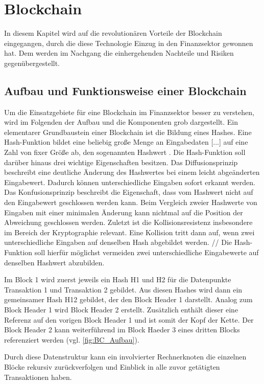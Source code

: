\section{Blockchain}
In diesem Kapitel wird auf die revolutionären Vorteile der Blockchain 
eingegangen, durch die diese Technologie Einzug in den Finanzsektor gewonnen 
hat. Dem werden im Nachgang die einhergehenden Nachteile und Risiken gegenübergestellt. 

\subsection{Aufbau und Funktionsweise einer Blockchain}
Um die Einsatzgebiete für eine Blockchain im Finanzsektor besser zu verstehen,
wird im Folgenden der Aufbau und die Komponenten grob dargestellt.
Ein elementarer Grundbaustein einer Blockchain ist die Bildung eines Hashes.
\glqq Eine Hash-Funktion bildet eine beliebig große Menge an Eingabedaten [...] auf eine Zahl von 
fixer Größe ab, den sogenannten Hashwert\grqq{} \cite[p.~6]{fill2020blockchain}.
Die Hash-Funktion soll darüber hinaus drei wichtige Eigenschaften besitzen.
Das Diffusionsprinzip beschreibt eine deutliche Änderung des Hashwertes bei einem leicht
abgeänderten Eingabewert. Dadurch können unterschiedliche Eingaben sofort erkannt werden.
Das Konfusionsprinzip beschreibt die Eigenschaft, dass vom Hashwert nicht auf den Eingabewert
geschlossen werden kann. Beim Vergleich zweier Hashwerte von Eingaben mit einer minimalen
Änderung kann nichtmal auf die Position der Abweichung geschlossen werden.
Zuletzt ist die Kollisionsresistenz insbesondere im Bereich der Kryptographie relevant.
Eine Kollision tritt dann auf, wenn zwei unterschiedliche Eingaben auf denselben Hash abgebildet
werden. // Die Hash-Funktion soll hierfür möglichst vermeiden zwei unterschiedliche Eingabewerte
auf denselben Hashwert abzubilden.
\cite[p.~6ff]{fill2020blockchain} 

Im Block 1 wird zuerst jeweils ein Hash H1 und H2 für die Datenpunkte Transaktion 1 
und Transaktion 2 gebildet. Aus diesen Hashes wird dann ein gemeinsamer Hash H12 gebildet, 
der den Block Header 1 darstellt.
Analog zum Block Header 1 wird Block Header 2 erstellt. Zusätzlich enthält dieser eine
Referenz auf den vorigen Block Header 1 und ist somit der Kopf der Kette. Der Block Header 2
kann weiterführend im Block Haeder 3 eines dritten Blocks referenziert werden 
(vgl. \autoref{fig:BC_Aufbau}). 

Durch diese Datenstruktur kann ein involvierter Rechnerknoten die einzelnen Blöcke rekursiv
zurückverfolgen und Einblick in alle zuvor getätigten Transaktionen haben.
\cite[p.~17f]{fill2020blockchain}

